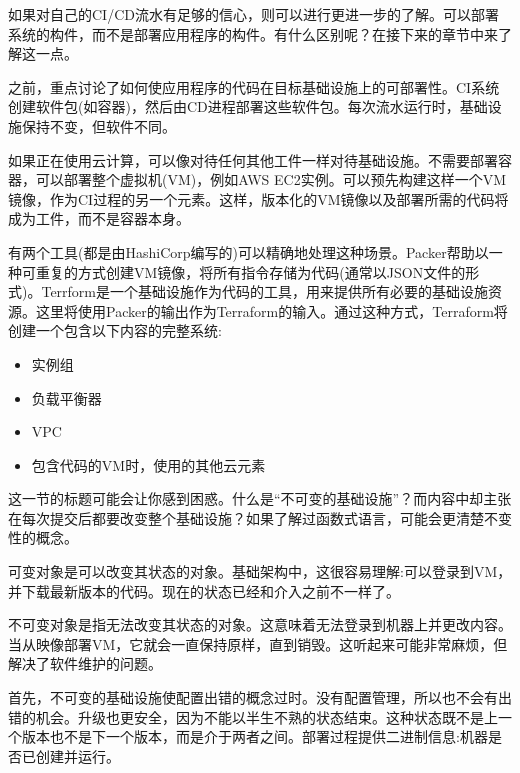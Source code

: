 
如果对自己的CI/CD流水有足够的信心，则可以进行更进一步的了解。可以部署系统的构件，而不是部署应用程序的构件。有什么区别呢？在接下来的章节中来了解这一点。


之前，重点讨论了如何使应用程序的代码在目标基础设施上的可部署性。CI系统创建软件包(如容器)，然后由CD进程部署这些软件包。每次流水运行时，基础设施保持不变，但软件不同。

如果正在使用云计算，可以像对待任何其他工件一样对待基础设施。不需要部署容器，可以部署整个虚拟机(VM)，例如AWS EC2实例。可以预先构建这样一个VM镜像，作为CI过程的另一个元素。这样，版本化的VM镜像以及部署所需的代码将成为工件，而不是容器本身。

有两个工具(都是由HashiCorp编写的)可以精确地处理这种场景。Packer帮助以一种可重复的方式创建VM镜像，将所有指令存储为代码(通常以JSON文件的形式)。Terrform是一个基础设施作为代码的工具，用来提供所有必要的基础设施资源。这里将使用Packer的输出作为Terraform的输入。通过这种方式，Terraform将创建一个包含以下内容的完整系统:

\begin{itemize}
\item 
实例组

\item 
负载平衡器

\item 
VPC

\item 
包含代码的VM时，使用的其他云元素
\end{itemize}

这一节的标题可能会让你感到困惑。什么是“不可变的基础设施”？而内容中却主张在每次提交后都要改变整个基础设施？如果了解过函数式语言，可能会更清楚不变性的概念。

可变对象是可以改变其状态的对象。基础架构中，这很容易理解:可以登录到VM，并下载最新版本的代码。现在的状态已经和介入之前不一样了。

不可变对象是指无法改变其状态的对象。这意味着无法登录到机器上并更改内容。当从映像部署VM，它就会一直保持原样，直到销毁。这听起来可能非常麻烦，但解决了软件维护的问题。


首先，不可变的基础设施使配置出错的概念过时。没有配置管理，所以也不会有出错的机会。升级也更安全，因为不能以半生不熟的状态结束。这种状态既不是上一个版本也不是下一个版本，而是介于两者之间。部署过程提供二进制信息:机器是否已创建并运行。

